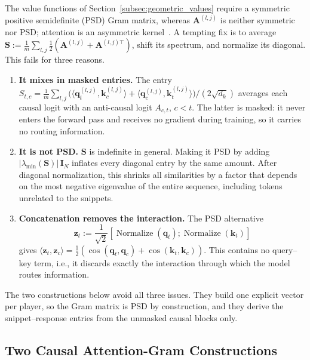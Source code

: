 \documentclass{article}
\begin{document}
The value functions of Section~\ref{subsec:geometric_values} require a symmetric positive semidefinite (PSD) Gram matrix, whereas $\mathbf{A}^{(l,j)}$ is neither symmetric nor PSD; attention is an asymmetric kernel~\cite{tsai2019transformer}. A tempting fix is to average $\mathbf{S} := \frac{1}{m} \sum_{l,j} \frac{1}{2}(\mathbf{A}^{(l,j)} + \mathbf{A}^{(l,j)\top})$, shift its spectrum, and normalize its diagonal. This fails for three reasons.
\begin{enumerate}
    \item \textbf{It mixes in masked entries.} The entry $S_{t,c} = \frac{1}{m}\sum_{l,j} \big(\langle \mathbf{q}_t^{(l,j)}, \mathbf{k}_c^{(l,j)} \rangle + \langle \mathbf{q}_c^{(l,j)}, \mathbf{k}_t^{(l,j)} \rangle\big) / (2\sqrt{d_k})$ averages each causal logit with an anti-causal logit $A_{c,t}$, $c < t$. The latter is masked: it never enters the forward pass and receives no gradient during training, so it carries no routing information.
    \item \textbf{It is not PSD.} $\mathbf{S}$ is indefinite in general. Making it PSD by adding $|\lambda_{\min}(\mathbf{S})|\,\mathbf{I}_N$ inflates every diagonal entry by the same amount. After diagonal normalization, this shrinks all similarities by a factor that depends on the most negative eigenvalue of the entire sequence, including tokens unrelated to the snippets.
    \item \textbf{Concatenation removes the interaction.} The PSD alternative 
    $$\mathbf{z}_t := \frac{1}{\sqrt{2}}[\operatorname{Normalize}(\mathbf{q}_t); \operatorname{Normalize}(\mathbf{k}_t)]$$
    gives $\langle \mathbf{z}_t, \mathbf{z}_c \rangle = \frac{1}{2}(\cos(\mathbf{q}_t, \mathbf{q}_c) + \cos(\mathbf{k}_t, \mathbf{k}_c))$. This contains no query--key term, i.e., it discards exactly the interaction through which the model routes information.
\end{enumerate}
The two constructions below avoid all three issues. They build one explicit vector per player, so the Gram matrix is PSD by construction, and they derive the snippet--response entries from the unmasked causal blocks only.

\subsection{Two Causal Attention-Gram Constructions}
\label{subsec:two_grams}
\end{document}
